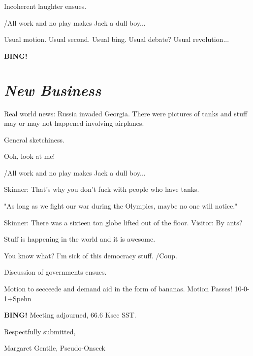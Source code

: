 \documentclass[10pt]{article}
\newcommand{\bing}{{\bf BING!} }
\newcommand{\goto}[1]{\bing \vskip 12pt \section*{{\em{#1}}}}
\begin{document}
Incoherent laughter ensues.

/All work and no play makes Jack a dull boy...

Usual motion.
Usual second.
Usual bing.
Usual debate?
Usual revolution...

\goto{New Business}

Real world news: Russia invaded Georgia. There were pictures of tanks and stuff may or may not happened involving airplanes. 

General sketchiness.

Ooh, look at me!

/All work and no play makes Jack a dull boy...

Skinner: That's why you don't fuck with people who have tanks.

"As long as we fight our war during the Olympics, maybe no one will notice."

Skinner: There was a sixteen ton globe lifted out of the floor.
Visitor: By ants?

Stuff is happening in the world and it is awesome.

You know what? I'm sick of this democracy stuff. /Coup.

Discussion of governments ensues. 

Motion to secceede and demand aid in the form of bananas.  
Motion Passes! 10-0-1+Spehn

\bing
\noindent
Meeting adjourned, 66.6 Ksec SST.

\vspace{18pt}

\centerline{Respectfully submitted,}
\centerline{Margaret Gentile, Pseudo-Onseck}
\end{document}
